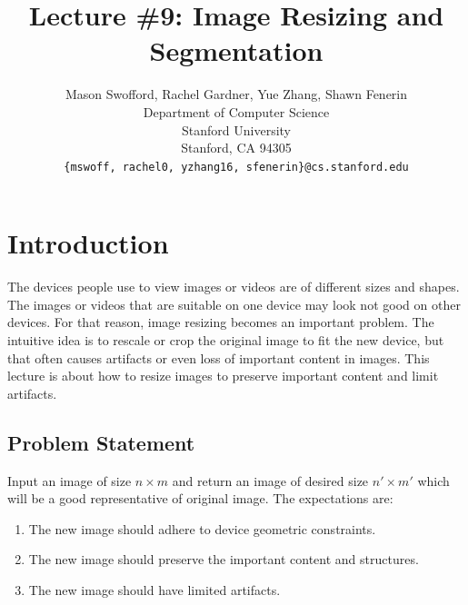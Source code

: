 \documentclass{article}
\title{Lecture \#9: Image Resizing and Segmentation}
\author{
  Mason Swofford, Rachel Gardner, Yue Zhang, Shawn Fenerin \\
  Department of Computer Science\\
  Stanford University\\
  Stanford, CA 94305 \\
  \texttt{\{mswoff, rachel0, yzhang16, sfenerin\}@cs.stanford.edu} \\
}
\begin{document}
\maketitle

\section{Introduction}
The devices people use to view images or videos are of different sizes and shapes. The images or videos that are suitable on one device may look not good on other devices. For that reason, image resizing becomes an important problem. The intuitive idea is to rescale or crop the original image to fit the new device, but that often causes artifacts or even loss of important content in images. This lecture is about how to resize images to preserve important content and limit artifacts.
\subsection{Problem Statement}
Input an image of size $n\times m$ and return an image of desired size $n'\times m'$ which will be a good representative of original image. The expectations are:
\begin{enumerate}
\item The new image should adhere to device geometric constraints.
\item The new image should preserve the important content and structures.
\item The new image should have limited artifacts.
\end{enumerate}
\end{document}
